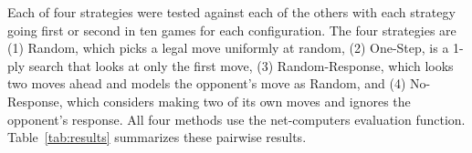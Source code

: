 





Each of four strategies were tested against each of the others with each strategy going first or second in ten games for each configuration.
The four strategies are (1) Random, which picks a legal move uniformly at random, (2) One-Step, is a 1-ply search that looks at only the first move, 
(3) Random-Response, which looks two moves ahead and models the opponent's move as Random, and 
(4) No-Response, which considers making two of its own moves and ignores the opponent's response.
All four methods use the net-computers evaluation function.
Table~\ref{tab:results} summarizes these pairwise results.


